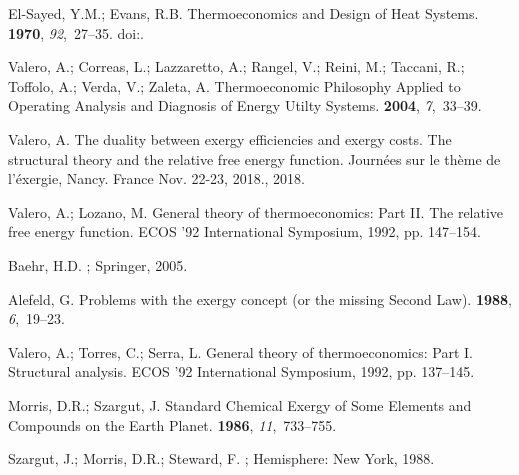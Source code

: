 \documentclass[energies,article,submit,moreauthors,pdftex]{Definitions/mdpi}
\begin{document}
\begin{thebibliography}{-------}
	El-Sayed, Y.M.; Evans, R.B.
	\newblock Thermoeconomics and Design of Heat Systems.
	 {\bf 1970}, {\em 92},~27--35.
	\newblock
	doi:{\href{https://doi.org/https://doi.org/10.1115/1.3445296}{}}.

	Valero, A.; Correas, L.; Lazzaretto, A.; Rangel, V.; Reini, M.; Taccani, R.;
	Toffolo, A.; Verda, V.; Zaleta, A.
	\newblock Thermoeconomic Philosophy Applied to Operating Analysis and Diagnosis
	of Energy Utilty Systems.
	 {\bf 2004}, {\em 7},~33--39.

	Valero, A.
	\newblock The duality between exergy efficiencies and exergy costs. {T}he
	structural theory and the relative free energy function.
	\newblock  Journées sur le thème de l'éxergie, Nancy. France Nov. 22-23,
	2018.,  2018.

	Valero, A.; Lozano, M.
	\newblock General theory of thermoeconomics: Part II. The relative free energy
	function.
	\newblock  ECOS '92 International Symposium,  1992, pp. 147--154.

	Baehr, H.D.
	; Springer,  2005.

	Alefeld, G.
	\newblock Problems with the exergy concept (or the missing {S}econd {L}aw).
	 {\bf 1988}, {\em 6},~19--23.

	Valero, A.; Torres, C.; Serra, L.
	\newblock General theory of thermoeconomics: Part I. Structural analysis.
	\newblock  ECOS '92 International Symposium,  1992, pp. 137--145.

	Morris, D.R.; Szargut, J.
	\newblock Standard Chemical Exergy of Some Elements and Compounds on the Earth
	Planet.
	 {\bf 1986}, {\em 11},~733--755.

	Szargut, J.; Morris, D.R.; Steward, F.
	; Hemisphere: New York,  1988.


\end{thebibliography}
\end{document}
